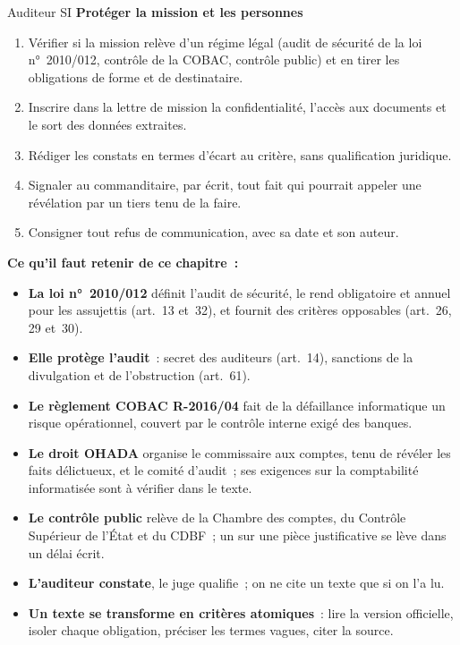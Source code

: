 \begin{boxmetier}{Auditeur SI}
\textbf{Protéger la mission et les personnes}
\begin{enumerate}
    \item Vérifier si la mission relève d'un régime légal (audit de
          sécurité de la loi n°~2010/012, contrôle de la COBAC, contrôle
          public) et en tirer les obligations de forme et de destinataire.
    \item Inscrire dans la lettre de mission la confidentialité, l'accès
          aux documents et le sort des données extraites.
    \item Rédiger les constats en termes d'écart au critère, sans
          qualification juridique.
    \item Signaler au commanditaire, par écrit, tout fait qui pourrait
          appeler une révélation par un tiers tenu de la faire.
    \item Consigner tout refus de communication, avec sa date et son
          auteur.
\end{enumerate}
\end{boxmetier}


\separateur

\begin{boxresume}
\textbf{Ce qu'il faut retenir de ce chapitre~:}
\begin{itemize}
    \item \textbf{La loi n°~2010/012} définit l'audit de sécurité, le rend
          obligatoire et annuel pour les assujettis (art.~13 et~32), et
          fournit des critères opposables (art.~26, 29 et~30).
    \item \textbf{Elle protège l'audit}~: secret des auditeurs (art.~14),
          sanctions de la divulgation et de l'obstruction (art.~61).
    \item \textbf{Le règlement COBAC R-2016/04} fait de la défaillance
          informatique un risque opérationnel, couvert par le contrôle
          interne exigé des banques.
    \item \textbf{Le droit OHADA} organise le commissaire aux comptes, tenu
          de révéler les faits délictueux, et le comité d'audit~; ses
          exigences sur la comptabilité informatisée sont à vérifier dans
          le texte.
    \item \textbf{Le contrôle public} relève de la Chambre des comptes, du
          Contrôle Supérieur de l'État et du CDBF~; un \NEK{} sur une pièce
          justificative se lève dans un délai écrit.
    \item \textbf{L'auditeur constate}, le juge qualifie~; on ne cite un
          texte que si on l'a lu.
    \item \textbf{Un texte se transforme en critères atomiques}~: lire la version officielle, isoler chaque obligation, préciser les termes vagues, citer la source.
\end{itemize}
\end{boxresume}

